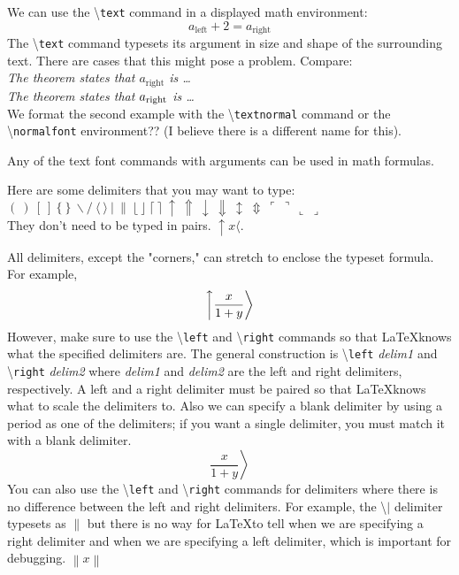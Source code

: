 \documentclass[12pt]{amsart}
\begin{document}
We can use the \textbackslash \texttt{text} command in a displayed math environment:
\[
   a_{\text{left}} + 2 = a_{\text{right}}
\]
The \textbackslash \texttt{text} command typesets its argument in size and shape of the surrounding text. There are cases that this might pose a problem. Compare: \\
\emph{The theorem states that \( a_\text{right} \) is \ldots} \\
\emph{The theorem states that \( a_\textnormal{right} \) is \ldots} \\
We format the second example with the \textbackslash \texttt{textnormal} command or the \textbackslash \texttt{normalfont} environment?? (I believe there is a different name for this).

Any of the text font commands with arguments can be used in math formulas.
\vspace{15pt}

Here are some delimiters that you may want to type: \\
\( ( \ ) \ [  \ ] \ \{ \ \} \ \backslash / \ \langle \ \rangle \ \vert \ \| \ \lfloor \ \rfloor \ \lceil \ \rceil \ \uparrow \ \Uparrow \ \downarrow \ \Downarrow \ \updownarrow \ \Updownarrow \ \ulcorner \ \urcorner \ \llcorner \ \lrcorner \) \\
They don't need to be typed in pairs. \( \uparrow x \langle \).

All delimiters, except the "corners," can stretch to enclose the typeset formula. For example,
\[
   \left\uparrow \frac{x}{1 + y} \right\rangle
\]
However, make sure to use the \textbackslash \texttt{left} and \textbackslash \texttt{right} commands so that \LaTeX knows what the specified delimiters are. The general construction is \textbackslash \texttt{left} \emph{delim1} and \textbackslash \texttt{right} \emph{delim2} where \emph{delim1} and \emph{delim2} are the left and right delimiters, respectively. A left and a right delimiter must be paired so that \LaTeX knows what to scale the delimiters to. Also we can specify a blank delimiter by using a period as one of the delimiters; if you want a single delimiter, you must match it with a blank delimiter.
\[
   \left. \frac{x}{1 + y} \right\rangle
\]
You can also use the \textbackslash \texttt{left} and \textbackslash \texttt{right} commands for delimiters where there is no difference between the left and right delimiters. For example, the \textbackslash \( \mid \) delimiter typesets as \( \| \) but there is no way for \LaTeX to tell when we are specifying a right delimiter and when we are specifying a left delimiter, which is important for debugging.
\( \left \| x \right \| \)
\end{document}
